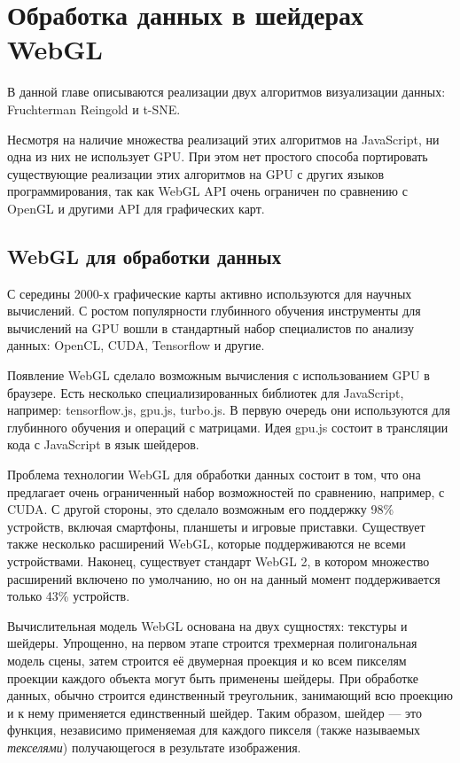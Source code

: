 \chapter{Обработка данных в шейдерах WebGL}

В данной главе описываются реализации двух алгоритмов визуализации данных: Fruchterman Reingold и t-SNE.

Несмотря на наличие множества реализаций этих алгоритмов на JavaScript, ни одна из них не использует GPU. При этом нет простого способа портировать существующие реализации этих алгоритмов на GPU с других языков программирования, так как WebGL API очень ограничен по сравнению с OpenGL и другими API для графических карт.

\section{WebGL для обработки данных}
\label{sec:webgl_data_analysis}

С середины 2000-х графические карты активно используются для научных вычислений. С ростом популярности глубинного обучения инструменты для вычислений на GPU вошли в стандартный набор специалистов по анализу данных: OpenCL, CUDA, Tensorflow и другие.

Появление WebGL сделало возможным вычисления с использованием GPU в браузере. Есть несколько специализированных библиотек для JavaScript, например: tensorflow.js, gpu.js, turbo.js. В первую очередь они используются для глубинного обучения и операций с матрицами. Идея gpu.js состоит в трансляции кода с JavaScript в язык шейдеров.

Проблема технологии WebGL для обработки данных состоит в том, что она предлагает очень ограниченный набор возможностей по сравнению, например, с CUDA. С другой стороны, это сделало возможным его поддержку 98\% устройств, включая смартфоны, планшеты и игровые приставки. Существует также несколько расширений WebGL, которые поддерживаются не всеми устройствами. Наконец, существует стандарт WebGL 2, в котором множество расширений включено по умолчанию, но он на данный момент поддерживается только 43\% устройств.

Вычислительная модель WebGL основана на двух сущностях: текстуры и шейдеры. Упрощенно, на первом этапе строится трехмерная полигональная модель сцены, затем строится её двумерная проекция и ко всем пикселям проекции каждого объекта могут быть применены шейдеры. При обработке данных, обычно строится единственный треугольник, занимающий всю проекцию и к нему применяется единственный шейдер. Таким образом, шейдер --- это функция, независимо применяемая для каждого пикселя (также называемых {\itshape текселями}) получающегося в результате изображения.

